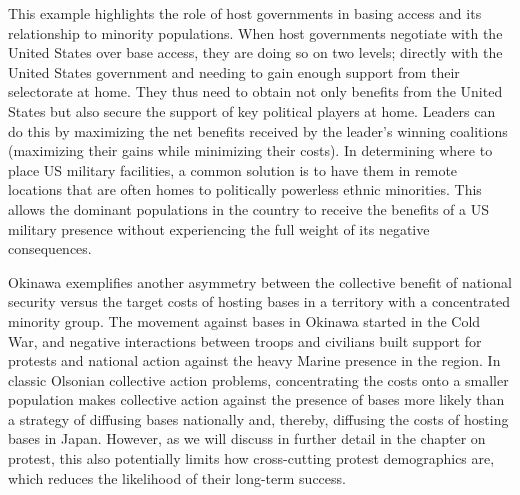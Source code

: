 This example highlights the role of host governments in basing access and its relationship to minority populations. When host governments negotiate with the United States over base access, they are doing so on two levels; directly with the United States government and needing to gain enough support from their selectorate at home.\cite{Putnam1988,demesquita2005,Cooley2008} They thus need to obtain not only benefits from the United States but also secure the support of key political players at home. Leaders can do this by maximizing the net benefits received by the leader's winning coalitions (maximizing their gains while minimizing their costs).\cite{demesquita2005} In determining where to place US military facilities, a common solution is to have them in remote locations that are often homes to politically powerless ethnic minorities. This allows the dominant populations in the country to receive the benefits of a US military presence without experiencing the full weight of its negative consequences.

Okinawa exemplifies another asymmetry between the collective benefit of national security versus the target costs of hosting bases in a territory with a concentrated minority group. The movement against bases in Okinawa started in the Cold War, and negative interactions between troops and civilians built support for protests and national action against the heavy Marine presence in the region. In classic Olsonian collective action problems, concentrating the costs onto a smaller population makes collective action against the presence of bases more likely than a strategy of diffusing bases nationally and, thereby, diffusing the costs of hosting bases in Japan.\cite{Olson1965} However, as we will discuss in further detail in the chapter on protest, this also potentially limits how cross-cutting protest demographics are, which reduces the likelihood of their long-term success.\cite{Yeo2011}


